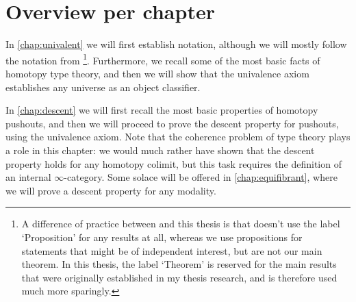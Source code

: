 \section{Overview per chapter}
In \cref{chap:univalent} we will first establish notation, although we will mostly follow the notation from \cite{hottbook}\footnote{A difference of practice between \cite{hottbook} and this thesis is that \cite{hottbook} doesn't use the label `Proposition' for any results at all, whereas we use propositions for statements that might be of independent interest, but are not our main theorem. In this thesis, the label `Theorem' is reserved for the main results that were originally established in my thesis research, and is therefore used much more sparingly.}. Furthermore, we recall some of the most basic facts of homotopy type theory, and then we will show that the univalence axiom establishes any universe as an object classifier. 

In \cref{chap:descent} we will first recall the most basic properties of homotopy pushouts, and then we will proceed to prove the descent property for pushouts, using the univalence axiom. Note that the coherence problem of type theory plays a role in this chapter: we would much rather have shown that the descent property holds for any homotopy colimit, but this task requires the definition of an internal $\infty$-category. Some solace will be offered in \cref{chap:equifibrant}, where we will prove a descent property for any modality.

